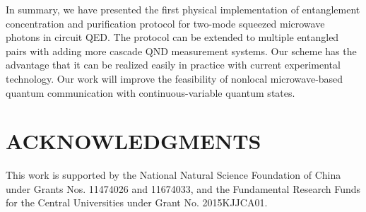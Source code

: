 \documentclass[preprintnumbers,showkeys,amsmath,amssymb]{revtex4}%
\begin{document}
In summary, we have presented the first physical implementation of
entanglement concentration and purification protocol for two-mode
squeezed microwave photons in circuit QED. The protocol can be extended to
multiple entangled pairs with adding more cascade QND measurement
systems. Our scheme has the advantage that it can be realized easily in practice with current
experimental technology. Our work will improve the feasibility of
nonlocal microwave-based quantum communication with
continuous-variable quantum states.





\section*{ACKNOWLEDGMENTS}
This work is supported by the National Natural Science Foundation of
China under Grants Nos. 11474026 and 11674033, and the
Fundamental Research Funds for the Central Universities under Grant
No. 2015KJJCA01.
\end{document}

